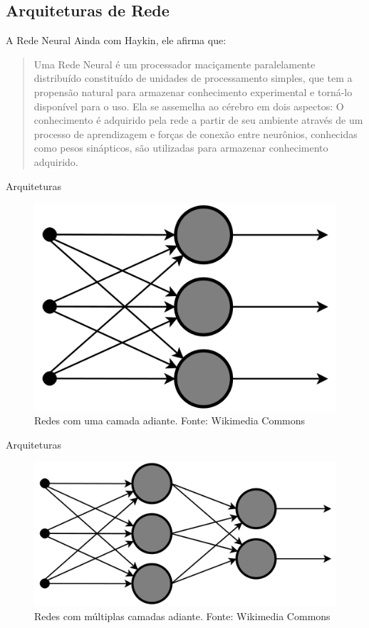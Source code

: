 \documentclass{beamer}
\begin{document}
    \subsection{Arquiteturas de Rede}  
      \begin{frame}{A Rede Neural}
	Ainda com Haykin, ele afirma que:
	\begin{quote}
	  Uma Rede Neural é um processador maciçamente paralelamente distribuído constituído de unidades de processamento simples, que tem a propensão natural para armazenar conhecimento experimental e torná-lo disponível para o uso. Ela se assemelha ao cérebro em dois aspectos: O conhecimento é adquirido pela rede a partir de seu ambiente através de um processo de aprendizagem e forças de conexão entre neurônios, conhecidas como pesos sinápticos, são utilizadas para armazenar conhecimento adquirido.
	\end{quote}
      \end{frame}
      
      \begin{frame}{Arquiteturas}
	\begin{figure}[htpb]
	  \includegraphics[scale=0.4]{topo1.png}
	  \caption{Redes com uma camada adiante. Fonte: Wikimedia Commons }
	\end{figure}
      \end{frame}

      \begin{frame}{Arquiteturas}
	\begin{figure}[htpb]
	  \includegraphics[scale=0.4]{topo3.png}
	  \caption{Redes com múltiplas camadas adiante. Fonte: Wikimedia Commons }
	\end{figure}
      \end{frame}
\end{document}
